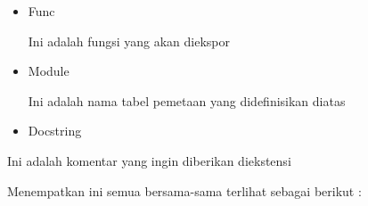 \documentclass{wileySix}
\begin{document}
\begin{myEnumerate}
{\begin{myEnumerate}
\begin{itemize}
	\noindent 
	~~  $  \{  $ "\textit{func}", (PyCFunction)\textit{module $  \_  $func}, METH $  \_  $NOARGS, NULL  $  \}  $, \par
	\noindent 
	~~  $  \{  $ NULL, NULL, 0, NULL  $  \}  $ \par
	\noindent 
	$  \}  $; \par
	\vspace{12pt}
	\noindent 
	\hspace*{0.5in} Bagian terakhir dari modul ekstensi adalah fungsi inialisasi. Fungsi ini dipanggil oleh juru bahasa Python saat modul diisikan. Hal ini diperlukan agar fungsi diberi nama intiModule dimana modul adalah nama modul. \par
	\noindent 
	\hspace*{0.5in} Fungsi inialisasi perlu diekspor dari perpustakaan yang akan dibangun. Header Python mendefinisikan PyMODINIT $  \_  $Func untuk memasukkan mantra yang sesuai agar terjadi pada lingkungan tertentu tempat menyuusun. Yang harus dilakukan adalah mengunakan saat menentukan fungsinya. \par
	\noindent 
	\hspace*{0.5in} Fungsi inialisasi C umumnya memiliki strktur keseluruhan berikut : \par
	\noindent 
	PyMODINIT $  \_  $FUNC init\textit{Module}()  $  \{  $ \par
	\noindent 
	~~ Py $  \_  $InitModule3(\textit{func}, \textit{module} $  \_  $methods, "docstring..."); \par
	\noindent 
	$  \}  $ \par
	\vspace{12pt}
	\noindent 
	Berikut adalah penjelasan fugsi Py $  \_  $IntiModule : \par
	\noindent 
	\item Func  \par
	\noindent 
	Ini adalah fungsi yang akan diekspor \par
	\noindent 
	\item Module \par
	\noindent 
	Ini adalah nama tabel pemetaan yang didefinisikan diatas \par
	\noindent 
	\item Docstring\end{itemize}
\par
\noindent 
Ini adalah komentar yang ingin diberikan diekstensi \par
\vspace{12pt}
\noindent 
\hspace*{0.5in} Menempatkan ini semua bersama-sama terlihat sebagai berikut : \par

\end{myEnumerate}}
\end{myEnumerate}
\end{document}
